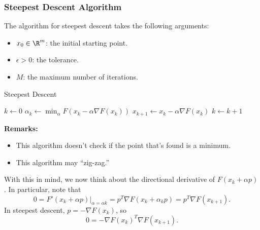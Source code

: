 \documentclass[letterpaper]{article}
\begin{document}
\subsubsection{Steepest Descent Algorithm}
The algorithm for steepest descent takes the following arguments: 
\begin{itemize}
    \item $x_0 \in \R^m$: the initial starting point. 
    \item $\epsilon > 0$: the tolerance.
    \item $M$: the maximum number of iterations.
\end{itemize}

\begin{algorithm}[H]
    \caption{Steepest Descent}
    \begin{algorithmic}[1]
            \State $k \gets 0$
                \State $\alpha_k \gets \min_{\alpha} F(x_{k} - \alpha \nabla F(x_{k}))$
                \State $x_{k + 1} \gets x_k - \alpha \nabla F(x_k)$
                \State $k \gets k + 1$
            \EndWhile 
        \EndFunction
    \end{algorithmic}
\end{algorithm}
\textbf{Remarks:}
\begin{itemize}
    \item This algorithm doesn't check if the point that's found is a minimum.
    \item This algorithm may ``zig-zag.'' 
\end{itemize}
With this in mind, we now think about the directional derivative of $F(x_{k} + \alpha p)$. In particular, note that \[0 = F'(x_k + \alpha p)|_{\alpha = \alpha k} = p^T \nabla F(x_k + \alpha_k p) = p^T \nabla F(x_{k + 1}).\] 
In steepest descent, $p = -\nabla F(x_k)$, so \[0 = -\nabla F(x_{k})^T \nabla F(x_{k + 1}).\]
\end{document}

